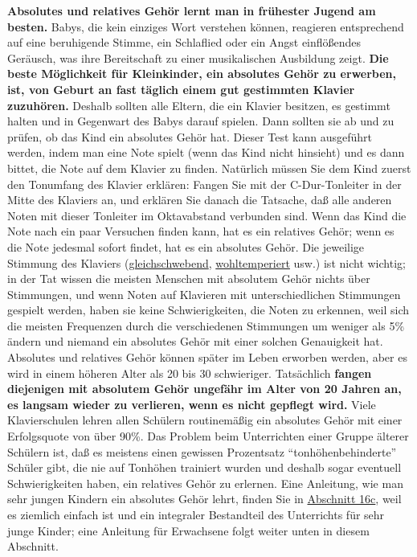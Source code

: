 \textbf{Absolutes und relatives Gehör lernt man in frühester Jugend am besten.}
Babys, die kein einziges Wort verstehen können, reagieren entsprechend auf eine beruhigende Stimme, ein Schlaflied oder ein Angst einflößendes Geräusch, was ihre Bereitschaft zu einer musikalischen Ausbildung zeigt.
\textbf{Die beste Möglichkeit für Kleinkinder, ein absolutes Gehör zu erwerben, ist, von Geburt an fast täglich einem gut gestimmten Klavier zuzuhören.}
Deshalb sollten alle Eltern, die ein Klavier besitzen, es gestimmt halten und in Gegenwart des Babys darauf spielen.
Dann sollten sie ab und zu prüfen, ob das Kind ein absolutes Gehör hat.
Dieser Test kann ausgeführt werden, indem man eine Note spielt (wenn das Kind nicht hinsieht) und es dann bittet, die Note auf dem Klavier zu finden.
Natürlich müssen Sie dem Kind zuerst den Tonumfang des Klavier erklären: Fangen Sie mit der C-Dur-Tonleiter in der Mitte des Klaviers an, und erklären Sie danach die Tatsache, daß alle anderen Noten mit dieser Tonleiter im Oktavabstand verbunden sind.
Wenn das Kind die Note nach ein paar Versuchen finden kann, hat es ein relatives Gehör; wenn es die Note jedesmal sofort findet, hat es ein absolutes Gehör.
Die jeweilige Stimmung des Klaviers (\hyperref[c2_6_et]{gleichschwebend}, \hyperref[c2_2_wtk2]{wohltemperiert} usw.) ist nicht wichtig; in der Tat wissen die meisten Menschen mit absolutem Gehör nichts über Stimmungen, und wenn Noten auf Klavieren mit unterschiedlichen Stimmungen gespielt werden, haben sie keine Schwierigkeiten, die Noten zu erkennen, weil sich die meisten Frequenzen durch die verschiedenen Stimmungen um weniger als 5\% ändern und niemand ein absolutes Gehör mit einer solchen Genauigkeit hat.
Absolutes und relatives Gehör können später im Leben erworben werden, aber es wird in einem höheren Alter als 20 bis 30 schwieriger.
Tatsächlich \textbf{fangen diejenigen mit absolutem Gehör ungefähr im Alter von 20 Jahren an, es langsam wieder zu verlieren, wenn es nicht gepflegt wird.}
Viele Klavierschulen lehren allen Schülern routinemäßig ein absolutes Gehör mit einer Erfolgsquote von über 90\%.
Das Problem beim Unterrichten einer Gruppe älterer Schülern ist, daß es meistens einen gewissen Prozentsatz \enquote{tonhöhenbehinderte} Schüler gibt, die nie auf Tonhöhen trainiert wurden und deshalb sogar eventuell Schwierigkeiten haben, ein relatives Gehör zu erlernen.
Eine Anleitung, wie man sehr jungen Kindern ein absolutes Gehör lehrt, finden Sie in \hyperref[c1iii16c]{Abschnitt 16c}, weil es ziemlich einfach ist und ein integraler Bestandteil des Unterrichts für sehr junge Kinder; eine Anleitung für Erwachsene folgt weiter unten in diesem Abschnitt.

